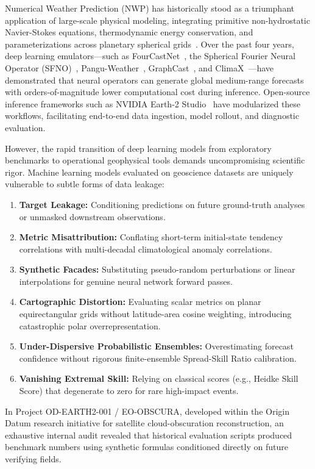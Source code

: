 \documentclass[10pt,twocolumn,letterpaper]{article}
\begin{document}
Numerical Weather Prediction (NWP) has historically stood as a triumphant application of large-scale physical modeling, integrating primitive non-hydrostatic Navier-Stokes equations, thermodynamic energy conservation, and parameterizations across planetary spherical grids~\cite{bauer2015quiet}. Over the past four years, deep learning emulators---such as FourCastNet~\cite{pathak2022fourcastnet}, the Spherical Fourier Neural Operator (SFNO)~\cite{bonev2023spherical}, Pangu-Weather~\cite{bi2023accurate}, GraphCast~\cite{lam2023learning}, and ClimaX~\cite{nguyen2023climax}---have demonstrated that neural operators can generate global medium-range forecasts with orders-of-magnitude lower computational cost during inference. Open-source inference frameworks such as NVIDIA Earth-2 Studio~\cite{earth2studio2024} have modularized these workflows, facilitating end-to-end data ingestion, model rollout, and diagnostic evaluation.

However, the rapid transition of deep learning models from exploratory benchmarks to operational geophysical tools demands uncompromising scientific rigor. Machine learning models evaluated on geoscience datasets are uniquely vulnerable to subtle forms of data leakage:
\begin{enumerate}
    \item \textbf{Target Leakage:} Conditioning predictions on future ground-truth analyses or unmasked downstream observations.
    \item \textbf{Metric Misattribution:} Conflating short-term initial-state tendency correlations with multi-decadal climatological anomaly correlations.
    \item \textbf{Synthetic Facades:} Substituting pseudo-random perturbations or linear interpolations for genuine neural network forward passes.
    \item \textbf{Cartographic Distortion:} Evaluating scalar metrics on planar equirectangular grids without latitude-area cosine weighting, introducing catastrophic polar overrepresentation.
    \item \textbf{Under-Dispersive Probabilistic Ensembles:} Overestimating forecast confidence without rigorous finite-ensemble Spread-Skill Ratio calibration.
    \item \textbf{Vanishing Extremal Skill:} Relying on classical scores (e.g., Heidke Skill Score) that degenerate to zero for rare high-impact events.
\end{enumerate}

In Project OD-EARTH2-001 / EO-OBSCURA, developed within the Origin Datum research initiative for satellite cloud-obscuration reconstruction, an exhaustive internal audit revealed that historical evaluation scripts produced benchmark numbers using synthetic formulas conditioned directly on future verifying fields.
\end{document}
